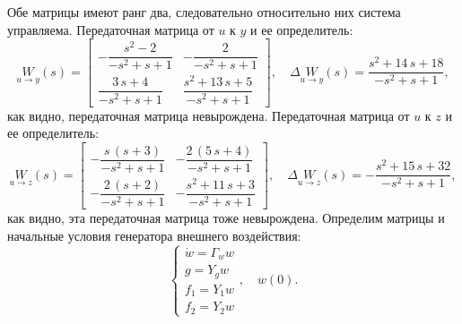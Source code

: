 Обе матрицы имеют ранг два, следовательно относительно них система управляема.
Передаточная матрица от $u$ к $y$ и ее определитель:
\begin{equation*}
    \underset{u\rightarrow y}{W}(s)=\begin{bmatrix}
-\dfrac{s^2 -2}{-s^2 +s+1} & -\dfrac{2}{-s^2 +s+1}\\[2ex]
\dfrac{3\,s+4}{-s^2 +s+1} & \dfrac{s^2 +13\,s+5}{-s^2 +s+1}
\end{bmatrix},\quad
\Delta\underset{u\rightarrow y}{W}(s)=\frac{s^2 +14\,s+18}{-s^2 +s+1},
\end{equation*}
как видно, передаточная матрица невырождена.
Передаточная матрица от $u$ к $z$ и ее определитель:
\begin{equation*}
    \underset{u\rightarrow z}{W}(s)=\begin{bmatrix}
-\dfrac{s\,{\left(s+3\right)}}{-s^2 +s+1} & -\dfrac{2\,{\left(5\,s+4\right)}}{-s^2 +s+1}\\[2ex]
-\dfrac{2\,{\left(s+2\right)}}{-s^2 +s+1} & -\dfrac{s^2 +11\,s+3}{-s^2 +s+1}
\end{bmatrix},\quad
\Delta\underset{u\rightarrow z}{W}(s)=-\frac{s^2 +15\,s+32}{-s^2 +s+1},
\end{equation*}
как видно, эта передаточная матрица тоже невырождена.
Определим матрицы и начальные условия генератора внешнего воздействия:
\begin{equation}
    \label{eq:gen}
    \begin{cases}
        \dot w=\Gamma_ww\\
        g=Y_gw\\
        f_1=Y_1w\\
        f_2=Y_2w
    \end{cases},\quad
    w(0).
\end{equation}
